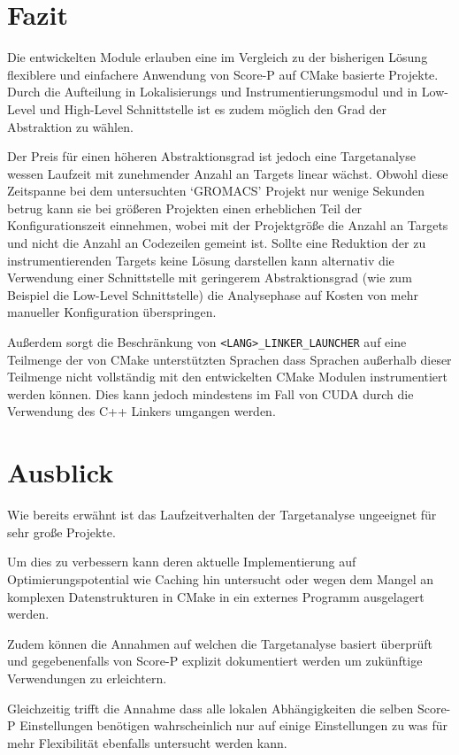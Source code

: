 \documentclass[german,proseminar,hyperref,utf8,lof]{zihpub}
\begin{document}
    \newpage
    \section{Fazit}
    Die entwickelten Module erlauben eine im Vergleich zu der bisherigen Lösung flexiblere und einfachere
    Anwendung von Score-P auf CMake basierte Projekte.
    Durch die Aufteilung in Lokalisierungs und Instrumentierungsmodul und in Low-Level und High-Level
    Schnittstelle ist es zudem möglich den Grad der Abstraktion zu wählen.

    Der Preis für einen höheren Abstraktionsgrad ist jedoch eine Targetanalyse wessen Laufzeit
    mit zunehmender Anzahl an Targets linear wächst.
    Obwohl diese Zeitspanne bei dem untersuchten `GROMACS' Projekt nur wenige Sekunden betrug
    kann sie bei grö{\ss}eren Projekten einen erheblichen Teil der Konfigurationszeit einnehmen, wobei
    mit der Projektgrö{\ss}e die Anzahl an Targets und nicht die Anzahl an Codezeilen gemeint ist.
    Sollte eine Reduktion der zu instrumentierenden Targets keine Lösung darstellen kann alternativ
    die Verwendung einer Schnittstelle mit geringerem Abstraktionsgrad (wie zum Beispiel die Low-Level
    Schnittstelle) die Analysephase auf Kosten von mehr manueller Konfiguration überspringen.

    Au{\ss}erdem sorgt die Beschränkung von \texttt{<LANG>\_LINKER\_LAUNCHER} auf eine Teilmenge
    der von CMake unterstützten Sprachen dass Sprachen au{\ss}erhalb dieser Teilmenge nicht vollständig
    mit den entwickelten CMake Modulen instrumentiert werden können.
    Dies kann jedoch mindestens im Fall von CUDA durch die Verwendung des C++ Linkers umgangen werden.


    \section{Ausblick}
    Wie bereits erwähnt ist das Laufzeitverhalten der Targetanalyse ungeeignet für sehr gro{\ss}e Projekte.

    Um dies zu verbessern kann deren aktuelle Implementierung auf Optimierungspotential wie Caching
    hin untersucht oder wegen dem Mangel an komplexen Datenstrukturen in CMake in ein externes
    Programm ausgelagert werden.

    Zudem können die Annahmen auf welchen die Targetanalyse basiert überprüft und gegebenenfalls von
    Score-P explizit dokumentiert werden um zukünftige Verwendungen zu erleichtern.
    
    Gleichzeitig trifft die Annahme dass alle lokalen Abhängigkeiten die selben Score-P Einstellungen
    benötigen wahrscheinlich nur auf einige Einstellungen zu was für mehr Flexibilität ebenfalls
    untersucht werden kann.
\end{document}
